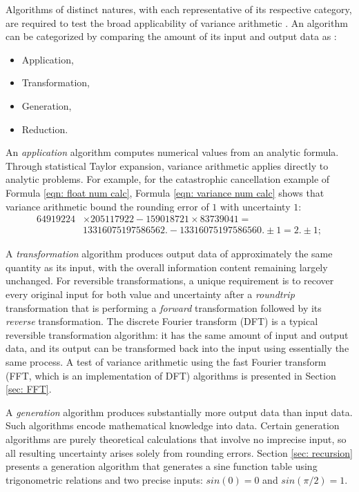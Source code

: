 \documentclass[twoside]{article}
\numberwithin{equation}{section}
\begin{document}
Algorithms of distinct natures, with each representative of its respective category, are required to test the broad applicability of variance arithmetic  \cite{Prev_Precision_Arithmetic}.  
An algorithm can be categorized by comparing the amount of its input and output data as \cite{Prev_Precision_Arithmetic}:
\begin{itemize}
\item Application,
\item Transformation,
\item Generation,
\item Reduction.
\end{itemize}

An \emph{application} algorithm computes numerical values from an analytic formula. 
Through statistical Taylor expansion, variance arithmetic applies directly to analytic problems.
For example, for the catastrophic cancellation example of Formula \eqref{eqn: float num calc}, Formula \eqref{eqn: variance num calc} shows that variance arithmetic bound the rounding error of $1$ with uncertainty $1$:
\begin{align}
\label{eqn: variance num calc}
64919224 &\times 205117922 - 159018721 \times 83739041 =\nonumber \\ 
&13316075197586562. - 13316075197586560. \pm 1 = 2. \pm 1;
\end{align}

A \emph{transformation} algorithm produces output data of approximately the same quantity as its input, with the overall information content remaining largely unchanged.  
For reversible transformations, a unique requirement is to recover every original input for both value and uncertainty after a \emph{roundtrip} transformation that is performing a \emph{forward} transformation followed by its \emph{reverse} transformation.  
The discrete Fourier transform (DFT) is a typical reversible transformation algorithm: it has the same amount of input and output data, and its output can be transformed back into the input using essentially the same process.  
A test of variance arithmetic using the fast Fourier transform (FFT, which is an implementation of DFT) algorithms is presented in Section \ref{sec: FFT}.

A \emph{generation} algorithm produces substantially more output data than input data.  
Such algorithms encode mathematical knowledge into data.  
Certain generation algorithms are purely theoretical calculations that involve no imprecise input, so all resulting uncertainty arises solely from rounding errors.  
Section \ref{sec: recursion} presents a generation algorithm that generates a sine function table using trigonometric relations and two precise inputs: $sin(0)=0$ and $sin(\pi/2)=1$.  
\end{document}
